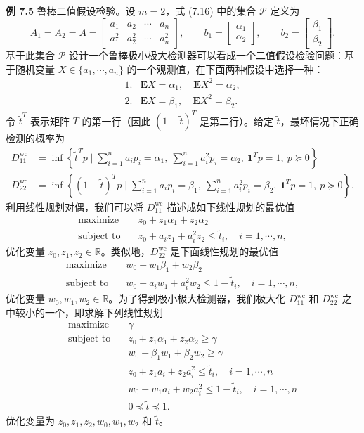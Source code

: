 \documentclass[UTF8, 12pt, fontset=fandol, oneside]{ctexart}
\begin{document}
\noindent\textbf{例 7.5}\quad
鲁棒二值假设检验。设 $m=2$，式 (7.16) 中的集合 $\mathcal{P}$ 定义为
\[
A_1=A_2=A=
\begin{bmatrix}
a_1 & a_2 & \cdots & a_n\\
a_1^2 & a_2^2 & \cdots & a_n^2
\end{bmatrix},
\qquad
b_1=
\begin{bmatrix}
\alpha_1\\
\alpha_2
\end{bmatrix},
\qquad
b_2=
\begin{bmatrix}
\beta_1\\
\beta_2
\end{bmatrix}.
\]
基于此集合 $\mathcal{P}$ 设计一个鲁棒极小极大检测器可以看成一个二值假设检验问题：基于随机变量 $X\in\{a_1,\cdots,a_n\}$ 的一个观测值，在下面两种假设中选择一种：
\[
\begin{array}{ll}
1. & \mathbf{E}X=\alpha_1,\quad \mathbf{E}X^2=\alpha_2,\\
2. & \mathbf{E}X=\beta_1,\quad \mathbf{E}X^2=\beta_2.
\end{array}
\]
令 $\tilde{t}^T$ 表示矩阵 $T$ 的第一行（因此 $(1-\tilde{t})^T$ 是第二行）。给定 $\tilde{t}$，最坏情况下正确检测的概率为
\[
\begin{aligned}
D_{11}^{\mathrm{wc}}&=\inf\left\{\tilde{t}^Tp\mid \sum_{i=1}^n a_ip_i=\alpha_1,\ \sum_{i=1}^n a_i^2p_i=\alpha_2,\ \mathbf{1}^Tp=1,\ p\succeq 0\right\}\\
D_{22}^{\mathrm{wc}}&=\inf\left\{(1-\tilde{t})^Tp\mid \sum_{i=1}^n a_ip_i=\beta_1,\ \sum_{i=1}^n a_i^2p_i=\beta_2,\ \mathbf{1}^Tp=1,\ p\succeq 0\right\}.
\end{aligned}
\]
利用线性规划对偶，我们可以将 $D_{11}^{\mathrm{wc}}$ 描述成如下线性规划的最优值
\[
\begin{aligned}
\text{maximize}\quad & z_0+z_1\alpha_1+z_2\alpha_2\\
\text{subject to}\quad & z_0+a_iz_1+a_i^2z_2\leq \tilde{t}_i,\quad i=1,\cdots,n,
\end{aligned}
\]
优化变量 $z_0,z_1,z_2\in\mathbb{R}$。类似地，$D_{22}^{\mathrm{wc}}$ 是下面线性规划的最优值
\[
\begin{aligned}
\text{maximize}\quad & w_0+w_1\beta_1+w_2\beta_2\\
\text{subject to}\quad & w_0+a_iw_1+a_i^2w_2\leq 1-\tilde{t}_i,\quad i=1,\cdots,n,
\end{aligned}
\]
优化变量 $w_0,w_1,w_2\in\mathbb{R}$。为了得到极小极大检测器，我们极大化 $D_{11}^{\mathrm{wc}}$ 和 $D_{22}^{\mathrm{wc}}$ 之中较小的一个，即求解下列线性规划
\[
\begin{aligned}
\text{maximize}\quad & \gamma\\
\text{subject to}\quad & z_0+z_1\alpha_1+z_2\alpha_2\geq \gamma\\
& w_0+\beta_1w_1+\beta_2w_2\geq \gamma\\
& z_0+z_1a_i+z_2a_i^2\leq \tilde{t}_i,\quad i=1,\cdots,n\\
& w_0+w_1a_i+w_2a_i^2\leq 1-\tilde{t}_i,\quad i=1,\cdots,n\\
& 0\preceq \tilde{t}\preceq 1.
\end{aligned}
\]
优化变量为 $z_0,z_1,z_2,w_0,w_1,w_2$ 和 $\tilde{t}$。
\end{document}

